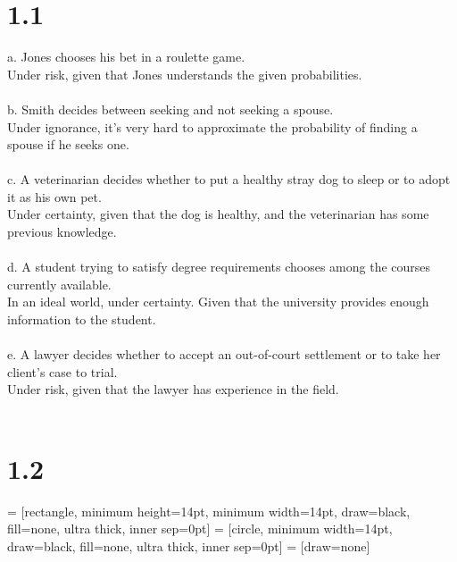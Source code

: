 \documentclass{article}
\begin{document}
\section*{1.1}
a. Jones chooses his bet in a roulette game.\\
Under risk, given that Jones understands the given probabilities.\\ \\
b. Smith decides between seeking and not seeking a spouse.\\
Under ignorance, it's very hard to approximate the probability of finding a spouse if he seeks one. \\ \\
c. A veterinarian decides whether to put a healthy stray dog to sleep or to adopt it as his own pet.\\
Under certainty, given that the dog is healthy, and the veterinarian has some previous knowledge. \\ \\
d. A student trying to satisfy degree requirements chooses among the courses currently available. \\
In an ideal world, under certainty. Given that the university provides enough information to the student. \\ \\
e. A lawyer decides whether to accept an out-of-court settlement or to take her client's case to trial.\\
Under risk, given that the lawyer has experience in the field. \\ \\

\section*{1.2}

 = [rectangle, minimum height=14pt, minimum width=14pt, draw=black, fill=none, ultra thick, inner sep=0pt]
 = [circle, minimum width=14pt, draw=black, fill=none, ultra thick, inner sep=0pt]
 = [draw=none]

\end{document}
